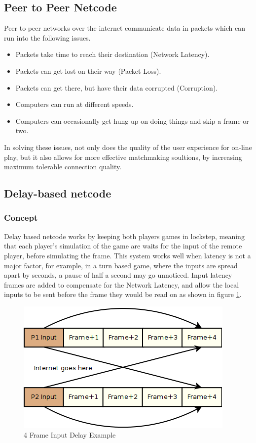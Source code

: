 \documentclass{entcs}
\begin{document}
\subsection{Peer to Peer Netcode}
Peer to peer networks over the internet communicate data in packets which can run into the following issues.
\begin{itemize}
\item{Packets take time to reach their destination (Network Latency).}
\item{Packets can get lost on their way (Packet Loss).}
\item{Packets can get there, but have their data corrupted (Corruption).}
\item{Computers can run at different speeds.}
\item{Computers can occasionally get hung up on doing things and skip a frame or two.}
\end{itemize}

In solving these issues, not only does the quality of the user experience for on-line play, but it also allows for more effective matchmaking soultions, by increasing maximum tolerable connection quality.

\subsection{Delay-based netcode}
\subsubsection{Concept}
Delay based netcode works by keeping both players games in lockstep, meaning that each player's simulation of the game are waits for the input of the remote player, before simulating the frame\cite{DelayBasedNetcode}. This system works well when latency is not a major factor, for example, in a turn based game, where the inputs are spread apart by seconds, a pause of half a second may go unnoticed.
Input latency frames are added to compensate for the Network Latency, and allow the local inputs to be sent before the frame they would be read on as shown in figure \ref{fig:InputLatencyEffect}.

\begin{figure}[h]
\centering
\includegraphics{InputDelay}
\caption{4 Frame Input Delay Example \cite{FightingGameNetworking}}
\label{fig:InputLatencyEffect}
\end{figure}
\end{document}
